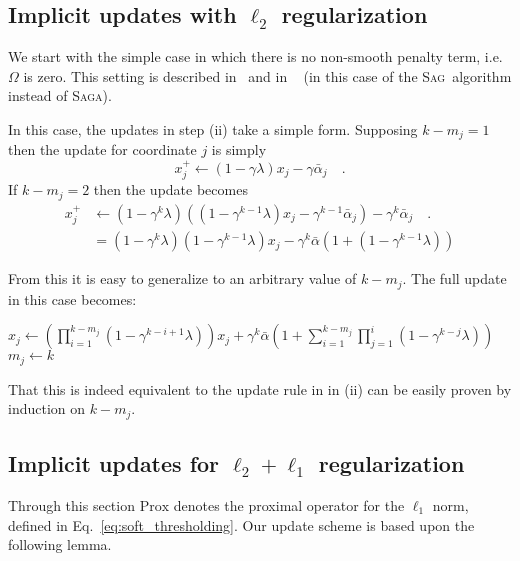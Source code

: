 \documentclass{scrartcl}
\newcommand{\SAGA}{\textsc{Saga}}
\newcommand{\SAG}{\textsc{Sag}}
\begin{document}
\subsection{Implicit updates with $\ell_2$ regularization}

We start with the simple case in which there is no non-smooth penalty term, i.e. $\Omega$ is zero. This setting is described in~\citep{defazio2014saga} and in ~\citep{schmidt2013minimizing} (in this case of the \SAG\ algorithm instead of \SAGA).


In this case, the updates in step (ii) take a simple form. Supposing $k-m_j = 1$ then the update for coordinate $j$ is simply
$$
x^+_j \gets (1 - \gamma \lambda)x_j - \gamma \bar{\alpha}_j \quad.
$$
If $k-m_j=2$ then the update becomes
$$
\begin{aligned}
x^+_j &\gets (1 - \gamma^{k} \lambda)((1 - \gamma^{k-1} \lambda)x_j - \gamma^{k-1} \bar{\alpha}_j) - \gamma^k \bar{\alpha}_j \quad. \\
&= (1 - \gamma^{k} \lambda)(1 - \gamma^{k-1} \lambda) x_j - \gamma^k \bar{\alpha} (1 + (1 - \gamma^{k-1} \lambda))
\end{aligned}
$$

From this it is easy to generalize to an arbitrary value of $k-m_j$. The full update in this case becomes:
\begin{algorithmic}
\State $x_j \gets \left(\prod_{i=1}^{k-m_j} (1 - \gamma^{k-i+1} \lambda )\right) x_j + \gamma^k \bar{\alpha} \left(1 + \sum_{i=1}^{k-m_j} \prod_{j=1}^i (1 - \gamma^{k-j} \lambda) \right)$
\State $m_j \gets k$
\EndFor
\end{algorithmic}

That this is indeed equivalent to the update rule in in (ii) can be easily proven by induction on $k - m_j$.


\subsection{Implicit updates for $\ell_2 + \ell_1$ regularization}

Through this section $\text{Prox}$ denotes the proximal operator for the $\ell_1$ norm, defined in Eq.~\eqref{eq:soft_thresholding}. Our update scheme is based upon the following lemma. 
\end{document}
